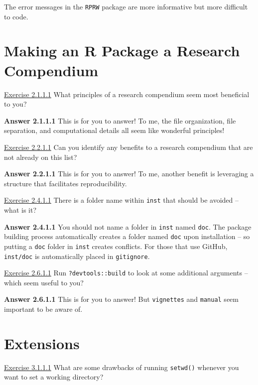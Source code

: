 \documentclass[
]{book}
\begin{document}
The error messages in the \texttt{RPRW} package are more informative but more difficult to code.

\hypertarget{making-an-r-package-a-research-compendium}{%
\section*{Making an R Package a Research Compendium}\label{making-an-r-package-a-research-compendium}}

\protect\hyperlink{ex-set7}{Exercise 2.1.1.1}
What principles of a research compendium seem most beneficial to you?

\textbf{Answer 2.1.1.1}
This is for you to answer! To me, the file organization, file separation, and computational details all seem like wonderful principles!

\protect\hyperlink{ex-set8}{Exercise 2.2.1.1}
Can you identify any benefits to a research compendium that are not already on this list?

\textbf{Answer 2.2.1.1}
This is for you to answer! To me, another benefit is leveraging a structure that facilitates reproducibility.

\protect\hyperlink{ex-set9}{Exercise 2.4.1.1}
There is a folder name within \texttt{inst} that should be avoided -- what is it?

\textbf{Answer 2.4.1.1}
You should not name a folder in \texttt{inst} named \texttt{doc}. The package building process automatically creates a folder named \texttt{doc} upon installation -- so putting a \texttt{doc} folder in \texttt{inst} creates conflicts. For those that use GitHub, \texttt{inst/doc} is automatically placed in \texttt{gitignore}.

\protect\hyperlink{ex-set10}{Exercise 2.6.1.1}
Run \texttt{?devtools::build} to look at some additional arguments -- which seem useful to you?

\textbf{Answer 2.6.1.1}
This is for you to answer! But \texttt{vignettes} and \texttt{manual} seem important to be aware of.

\hypertarget{extensions-1}{%
\section*{Extensions}\label{extensions-1}}

\protect\hyperlink{ex-set11}{Exercise 3.1.1.1}
What are some drawbacks of running \texttt{setwd()} whenever you want to set a working directory?
\end{document}
